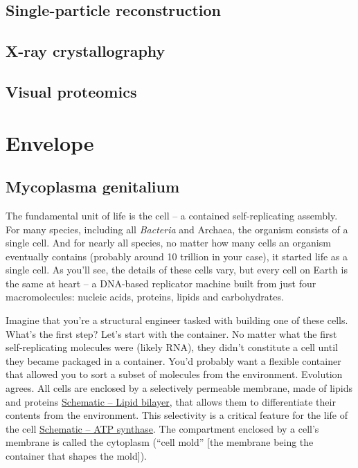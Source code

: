 \documentclass[]{tufte-book}
\begin{document}
\section{Single-particle
reconstruction}\label{single-particle-reconstruction}

\section{X-ray crystallography}\label{x-ray-crystallography}

\section{Visual proteomics}\label{visual-proteomics}

\chapter{Envelope}\label{envelope}

\section{Mycoplasma genitalium}\label{mycoplasma-genitalium}

The fundamental unit of life is the cell -- a contained self-replicating
assembly. For many species, including all \emph{Bacteria} and Archaea,
the organism consists of a single cell. And for nearly all species, no
matter how many cells an organism eventually contains (probably around
10 trillion in your case), it started life as a single cell. As you'll
see, the details of these cells vary, but every cell on Earth is the
same at heart -- a DNA-based replicator machine built from just four
macromolecules: nucleic acids, proteins, lipids and carbohydrates.

Imagine that you're a structural engineer tasked with building one of
these cells. What's the first step? Let's start with the container. No
matter what the first self-replicating molecules were (likely RNA), they
didn't constitute a cell until they became packaged in a container.
You'd probably want a flexible container that allowed you to sort a
subset of molecules from the environment. Evolution agrees. All cells
are enclosed by a selectively permeable membrane, made of lipids and
proteins \protect\hyperlink{fig:2-1-1}{Schematic -- Lipid bilayer}, that
allows them to differentiate their contents from the environment. This
selectivity is a critical feature for the life of the cell
\protect\hyperlink{fig:2-1-2}{Schematic -- ATP synthase}. The
compartment enclosed by a cell's membrane is called the cytoplasm
(``cell mold'' {[}the membrane being the container that shapes the
mold{]}).
\end{document}
